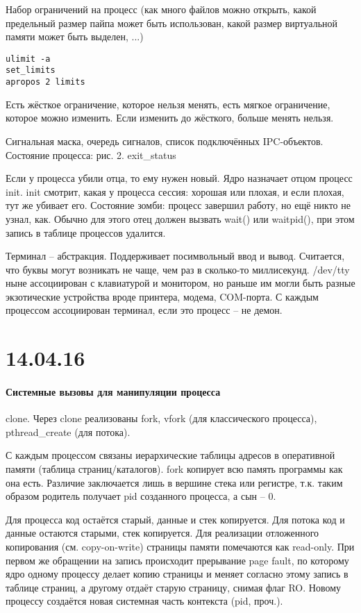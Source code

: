 \documentclass[a4paper,10pt]{article}
\begin{document}
\begin{enumerate}
\begin{enumerate}
Набор ограничений на процесс (как много файлов можно открыть, какой предельный размер пайпа может быть использован, какой размер виртуальной памяти может быть выделен, ...)
\begin{verbatim}
ulimit -a 
set_limits
apropos 2 limits
\end{verbatim}

Есть жёсткое ограничение, которое нельзя менять, есть мягкое ограничение, которое можно изменить. Если изменить до жёсткого, больше менять нельзя.

Сигнальная маска, очередь сигналов, список подключённых IPC-объектов. 
Состояние процесса: рис. 2.
exit\_status

Если у процесса убили отца, то ему нужен новый. Ядро назначает отцом процесс init. init смотрит, какая у процесса сессия: хорошая или плохая, и если плохая, тут же убивает его.
Состояние зомби: процесс завершил работу, но ещё никто не узнал, как. Обычно для этого отец должен вызвать wait() или waitpid(), при этом запись в таблице процессов удалится.

Терминал -- абстракция. Поддерживает посимвольный ввод и вывод. Считается, что буквы могут возникать не чаще, чем раз в сколько-то миллисекунд. /dev/tty ныне ассоциирован с клавиатурой и монитором, но раньше им могли быть разные экзотические устройства вроде принтера, модема, COM-порта. С каждым процессом ассоциирован терминал, если это процесс -- не демон.

\end{enumerate}
\end{enumerate}

\section{14.04.16}
\paragraph{Системные вызовы для манипуляции процесса}
clone. Через clone реализованы fork, vfork (для классического процесса), pthread\_create (для потока).

С каждым процессом связаны иерархические таблицы адресов в оперативной памяти (таблица страниц/каталогов). fork копирует всю память программы как она есть. Различие заключается лишь в вершине стека или регистре, т.к. таким образом родитель получает pid созданного процесса, а сын -- 0. 

Для процесса код остаётся старый, данные и стек копируется. Для потока код и данные остаются старыми, стек копируется. Для реализации отложенного копирования (см. copy-on-write) страницы памяти помечаются как read-only. При первом же обращении на запись происходит прерывание page fault, по которому ядро одному процессу делает копию страницы и меняет согласно этому запись в таблице страниц, а другому отдаёт старую страницу, снимая флаг RO. Новому процессу создаётся новая системная часть контекста (pid, проч.).
\end{document}
